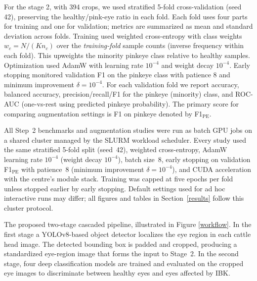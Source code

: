 \documentclass[preprint,12pt,authoryear]{elsarticle}
\begin{document}
For the stage 2, with 394 crops, we used stratified 5-fold cross-validation (seed 42), preserving the healthy/pink-eye ratio in each fold. Each fold uses four parts for training and one for validation; metrics are summarized as mean and standard deviation across folds. Training used weighted cross-entropy with class weights $w_c = N / (K n_c)$ over the \emph{training-fold} sample counts (inverse frequency within each fold). This upweights the minority pinkeye class relative to healthy samples. Optimization used AdamW \citep{loshchilov2018adamw} with learning rate $10^{-4}$ and weight decay $10^{-4}$. Early stopping monitored validation F1 on the pinkeye class with patience 8 and minimum improvement $\delta = 10^{-4}$. For each validation fold we report accuracy, balanced accuracy, precision/recall/F1 for the pinkeye (minority) class, and ROC-AUC (one-vs-rest using predicted pinkeye probability). The primary score for comparing augmentation settings is F1 on pinkeye denoted by F1$_{\mathrm{PE}}$.


All Step~2 benchmarks and augmentation studies were run as batch GPU jobs on a shared cluster managed by the SLURM workload scheduler. Every study used the same stratified 5-fold split (seed~42), weighted cross-entropy, AdamW learning rate $10^{-4}$ (weight decay $10^{-4}$), batch size~8, early stopping on validation F1$_{\mathrm{PE}}$ with patience~8 (minimum improvement $\delta{=}10^{-4}$), and CUDA acceleration with the centre's module stack. Training was capped at five epochs per fold unless stopped earlier by early stopping. Default settings used for ad hoc interactive runs may differ; all figures and tables in Section~\ref{results} follow this cluster protocol.


The proposed %
two-stage cascaded pipeline, illustrated in Figure \ref{workflow}. In the first stage a YOLOv8-based object detector localizes the eye region in each cattle head image. The detected bounding box is padded and cropped, producing a standardized eye-region image that forms the input to Stage~2. In the second stage, four deep classification models are trained and evaluated on the cropped eye images to discriminate between healthy eyes and eyes affected by IBK.
\end{document}
